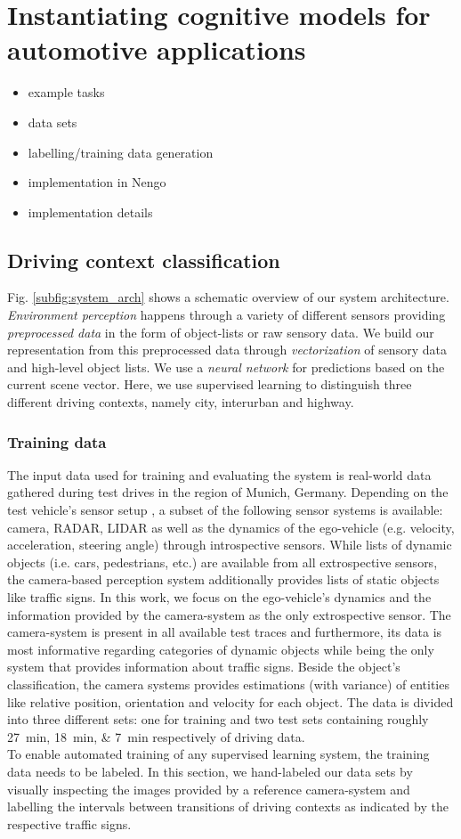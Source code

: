\chapter{Instantiating cognitive models for automotive applications}
\begin{itemize}
	\item example tasks
	\item data sets
	\item labelling/training data generation
	\item implementation in \ac{Nengo}
	\item implementation details
\end{itemize}
\section{Driving context classification}
\label{sec:driving_context_class}
Fig. \ref{subfig:system_arch} shows a schematic overview of our system architecture. 
\textit{Environment perception} happens through a variety of different sensors \cite{Aeberhard2015} providing \textit{preprocessed data} in the form of object-lists or raw sensory data.
We build our representation from this preprocessed data through \textit{vectorization} of sensory data and high-level object lists.
We use a \textit{neural network} for predictions based on the current scene vector.
Here, we use supervised learning to distinguish three different driving contexts, namely city, interurban and highway.
\subsection{Training data}
The input data used for training and evaluating the system is real-world data gathered during test drives in the region of Munich, Germany. 
Depending on the test vehicle's sensor setup \cite{Aeberhard2015}, a subset of the following sensor systems is available: camera, RADAR, LIDAR as well as the dynamics of the ego-vehicle (e.g. velocity, acceleration, steering angle) through introspective sensors. 
While lists of dynamic objects (i.e. cars, pedestrians, etc.) are available from all extrospective sensors, the camera-based perception system additionally provides lists of static objects like traffic signs. 
In this work, we focus on the ego-vehicle's dynamics and the information provided by the camera-system as the only extrospective sensor. 
The camera-system is present in all available test traces and furthermore, its data is most informative regarding categories of dynamic objects while being the only system that provides information about traffic signs. 
Beside the object's classification, the camera systems provides estimations (with variance) of entities like relative position, orientation and velocity for each object. 
The data is divided into three different sets: one for training and two test sets containing roughly \SIlist{27;18;7}{\minute} respectively of driving data.\\
To enable automated training of any supervised learning system, the training data needs to be labeled. 
In this section, we hand-labeled our data sets by visually inspecting the images provided by a reference camera-system and labelling the intervals  between transitions of driving contexts as indicated by the respective traffic signs. 
